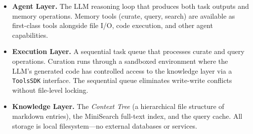 \documentclass[11pt]{article}
\newcommand{\contexttree}{\textit{Context Tree}}
\begin{document}
\begin{itemize}[leftmargin=*]
  \item \textbf{Agent Layer.}
    The LLM reasoning loop that produces both task outputs and memory operations.
    Memory tools (curate, query, search) are available as first-class tools
    alongside file I/O, code execution, and other agent capabilities.

  \item \textbf{Execution Layer.}
    A sequential task queue that processes curate and query operations.
    Curation runs through a sandboxed environment where the LLM's generated code
    has controlled access to the knowledge layer via a \texttt{ToolsSDK} interface.
    The sequential queue eliminates write-write conflicts without file-level locking.

  \item \textbf{Knowledge Layer.}
    The \contexttree{} (a hierarchical file structure of markdown entries),
    the MiniSearch full-text index, and the query cache.
    All storage is local filesystem---no external databases or services.
\end{itemize}
\end{document}

